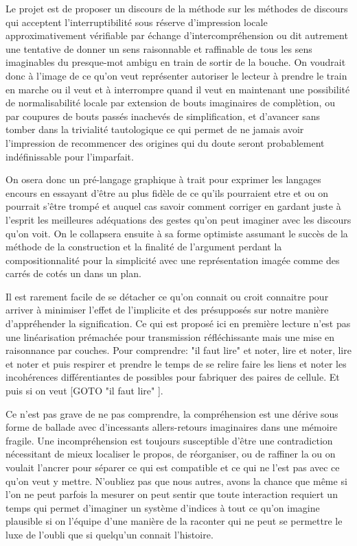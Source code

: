 \documentclass{article}
\begin{document}
 Le projet est de proposer un discours de la méthode sur les méthodes de discours qui acceptent l'interruptibilité sous réserve d'impression locale
 approximativement vérifiable par échange d'intercompréhension ou dit autrement une tentative de donner un sens raisonnable et raffinable de tous les  sens imaginables du presque-mot ambigu en train de sortir de la bouche. On voudrait donc à l'image de ce qu'on veut représenter autoriser le lecteur à prendre le train en marche ou il veut et à interrompre quand il veut en maintenant une possibilité de normalisabilité locale par extension de bouts imaginaires de complètion, ou par coupures de bouts passés inachevés  de simplification, et d'avancer sans tomber dans la trivialité tautologique ce qui permet de  ne jamais avoir l'impression de recommencer des origines qui du doute seront probablement  indéfinissable pour l'imparfait.
  
  On osera  donc un pré-langage graphique à trait pour exprimer   les langages encours  en essayant d'être au plus fidèle de ce qu'ils pourraient etre et ou on pourrait s'être trompé et auquel cas savoir  comment corriger en gardant juste à l'esprit les meilleures adéquations des gestes qu'on peut imaginer avec les discours qu'on voit. On le collapsera ensuite à sa forme optimiste assumant le succès de la méthode de la construction et la finalité de l'argument perdant la compositionnalité pour la simplicité avec une représentation imagée comme des carrés de cotés un dans un plan.
  
Il est rarement facile de se détacher ce qu'on connait ou croit connaitre pour arriver à minimiser l'effet de l'implicite et des présupposés sur notre manière 
d'appréhender la signification. Ce qui est proposé ici en première lecture n'est pas une linéarisation prémachée pour transmission réfléchissante mais une mise en raisonnance par couches. Pour comprendre: "il faut lire" et noter, lire et noter, lire et noter et puis respirer et prendre le temps de se relire faire les liens et noter les incohérences différentiantes de possibles pour fabriquer des paires de cellule. Et puis si on veut [GOTO  "il faut lire" ].

Ce n'est pas grave de ne pas comprendre, la compréhension est une dérive sous forme de ballade avec d'incessants allers-retours imaginaires  dans une mémoire fragile.   Une incompréhension est toujours susceptible d'être une contradiction nécessitant de mieux localiser le propos, de réorganiser, ou de raffiner  la ou on voulait l'ancrer pour séparer ce qui est compatible et ce qui ne l'est pas avec ce qu'on veut y mettre. N'oubliez pas que nous autres, avons la chance que même si l'on ne peut parfois la mesurer on peut sentir que toute interaction requiert un temps qui permet d'imaginer un système d'indices à tout ce qu'on imagine plausible si on l'équipe d'une manière  de la raconter qui ne peut se permettre le luxe de l'oubli que si quelqu'un connait l'histoire. 
 
\end{document}
